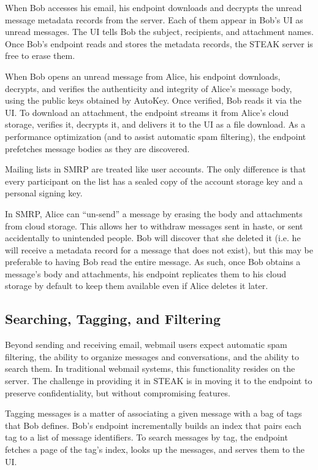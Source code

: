 When Bob accesses his email, his endpoint downloads and decrypts the unread message metadata records from the server.  Each of them appear in Bob's UI as unread messages. The UI tells Bob the subject, recipients, and attachment names.  Once Bob's endpoint reads and stores the metadata records, the STEAK server is free to erase them.  

When Bob opens an unread message from Alice, his endpoint downloads, decrypts, and verifies the authenticity and integrity of Alice's message body, using the public keys obtained by AutoKey. Once verified, Bob reads it via the UI. To download an attachment, the endpoint streams it from Alice's cloud storage, verifies it, decrypts it, and delivers it to the UI as a file download.  As a performance optimization (and to assist automatic spam filtering), the endpoint prefetches message bodies as they are discovered.

Mailing lists in SMRP are treated like user accounts.  The only difference is that every participant on the list has a sealed copy of the account storage key and a personal signing key.

In SMRP, Alice can “un-send” a message by erasing the body and attachments from cloud storage.  This allows her to withdraw messages sent in haste, or sent accidentally to unintended people.  Bob will discover that she deleted it (i.e. he will receive a metadata record for a message that does not exist), but this may be preferable to having Bob read the entire message.  As such, once Bob obtains a message’s body and attachments, his endpoint replicates them to his cloud storage by default to keep them available even if Alice deletes it later.

\subsection{Searching, Tagging, and Filtering}
Beyond sending and receiving email, webmail users expect automatic spam filtering, the ability to organize messages and conversations, and the ability to search them.  In traditional webmail systems, this functionality resides on the server.  The challenge in providing it in STEAK is in moving it to the endpoint to preserve confidentiality, but without compromising features.

Tagging messages is a matter of associating a given message with a bag of tags that Bob defines.  Bob’s endpoint incrementally builds an index that pairs each tag to a list of message identifiers.  To search messages by tag, the endpoint fetches a page of the tag’s index, looks up the messages, and serves them to the UI.

